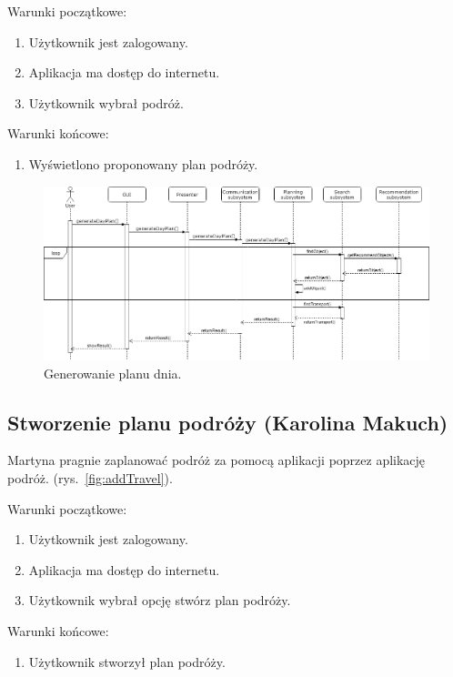 \documentclass[10pt,twoside,a4paper]{report}
\begin{document}
\noindent Warunki początkowe:
\begin{enumerate}
  \item Użytkownik jest zalogowany.
  \item Aplikacja ma dostęp do internetu.
  \item Użytkownik wybrał podróż.
\end{enumerate}
\par
\noindent\newline
Warunki końcowe:
\begin{enumerate}
  \item Wyświetlono proponowany plan podróży.
\end{enumerate}

\noindent\newline
\begin{figure}[h]
\centering
\includegraphics[width=\linewidth]{generateDayPlan}
\caption{Generowanie planu dnia.}
\label{fig:generateDayPlan}
\end{figure}
\FloatBarrier


\subsection{Stworzenie planu podróży (Karolina Makuch)}
\FloatBarrier
\par Martyna pragnie zaplanować podróż za pomocą aplikacji poprzez aplikację podróż.  (rys.~\ref{fig:addTravel}).

\noindent\newline Warunki początkowe:
\begin{enumerate}
  \item Użytkownik jest zalogowany.
  \item Aplikacja ma dostęp do internetu.
  \item Użytkownik wybrał opcję stwórz plan podróży.
\end{enumerate}
\par
\noindent\newline
Warunki końcowe:
\begin{enumerate}
  \item Użytkownik stworzył plan podróży.
\end{enumerate}
\end{document}
